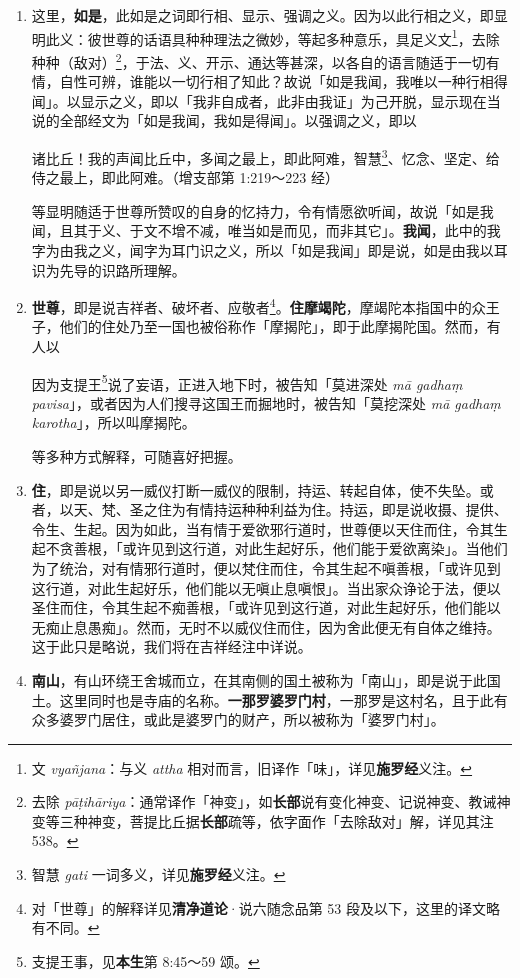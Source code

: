 \begin{enumerate}
\item 这里，\textbf{如是}，此如是之词即行相、显示、强调之义。因为以此行相之义，即显明此义：彼世尊的话语具种种理法之微妙，等起多种意乐，具足义文\footnote{文 \textit{vyañjana}：与义 \textit{attha} 相对而言，旧译作「味」，详见\textbf{施罗经}义注。}，去除种种（敌对）\footnote{去除 \textit{pāṭihāriya}：通常译作「神变」，如\textbf{长部}说有变化神变、记说神变、教诫神变等三种神变，菩提比丘据\textbf{长部}疏等，依字面作「去除敌对」解，详见其注 538。}，于法、义、开示、通达等甚深，以各自的语言随适于一切有情，自性可辨，谁能以一切行相了知此？故说「如是我闻，我唯以一种行相得闻」。以显示之义，即以「我非自成者，此非由我证」为己开脱，显示现在当说的全部经文为「如是我闻，我如是得闻」。以强调之义，即以\begin{quoting}诸比丘！我的声闻比丘中，多闻之最上，即此阿难，智慧\footnote{智慧 \textit{gati} 一词多义，详见\textbf{施罗经}义注。}、忆念、坚定、给侍之最上，即此阿难。（增支部第 1:219～223 经）\end{quoting}等显明随适于世尊所赞叹的自身的忆持力，令有情愿欲听闻，故说「如是我闻，且其于义、于文不增不减，唯当如是而见，而非其它」。\textbf{我闻}，此中的我字为由我之义，闻字为耳门识之义，所以「如是我闻」即是说，如是由我以耳识为先导的识路所理解。
\item \textbf{世尊}，即是说吉祥者、破坏者、应敬者\footnote{对「世尊」的解释详见\textbf{清净道论}·说六随念品第 53 段及以下，这里的译文略有不同。}。\textbf{住摩竭陀}，摩竭陀本指国中的众王子，他们的住处乃至一国也被俗称作「摩揭陀」，即于此摩揭陀国。然而，有人以\begin{quoting}因为支提王\footnote{支提王事，见\textbf{本生}第 8:45～59 颂。}说了妄语，正进入地下时，被告知「莫进深处 \textit{mā gadhaṃ pavisa}」，或者因为人们搜寻这国王而掘地时，被告知「莫挖深处 \textit{mā gadhaṃ karotha}」，所以叫摩揭陀。\end{quoting}等多种方式解释，可随喜好把握。
\item \textbf{住}，即是说以另一威仪打断一威仪的限制，持运、转起自体，使不失坠。或者，以天、梵、圣之住为有情持运种种利益为住。持运，即是说收摄、提供、令生、生起。因为如此，当有情于爱欲邪行道时，世尊便以天住而住，令其生起不贪善根，「或许见到这行道，对此生起好乐，他们能于爱欲离染」。当他们为了统治，对有情邪行道时，便以梵住而住，令其生起不嗔善根，「或许见到这行道，对此生起好乐，他们能以无嗔止息嗔恨」。当出家众诤论于法，便以圣住而住，令其生起不痴善根，「或许见到这行道，对此生起好乐，他们能以无痴止息愚痴」。然而，无时不以威仪住而住，因为舍此便无有自体之维持。这于此只是略说，我们将在吉祥经注中详说。
\item \textbf{南山}，有山环绕王舍城而立，在其南侧的国土被称为「南山」，即是说于此国土。这里同时也是寺庙的名称。\textbf{一那罗婆罗门村}，一那罗是这村名，且于此有众多婆罗门居住，或此是婆罗门的财产，所以被称为「婆罗门村」。\end{enumerate}

